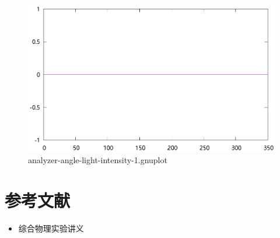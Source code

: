 \documentclass{ctexart}
\begin{document}
    \begin{figure}[H]
      \centering
      \includegraphics[width=\linewidth]{../output/analyzer-angle-light-intensity-1.gnuplot}
      \caption{analyzer-angle-light-intensity-1.gnuplot}
      \label{fig:analyzer-angle-light-intensity-1.gnuplot}
    \end{figure}
    \section{参考文献}
    \begin{itemize}[leftmargin=0pt]
        \item[] 综合物理实验讲义
    \end{itemize}
\end{document}
